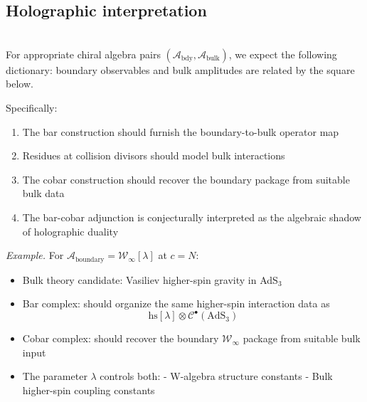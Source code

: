 \subsection{Holographic interpretation}

\begin{conjecture}\label{conj:holographic-koszul}
\leavevmode\\
For appropriate chiral algebra pairs
$(\mathcal{A}_{\mathrm{bdy}}, \mathcal{A}_{\mathrm{bulk}})$,
we expect the following dictionary:
boundary observables and bulk amplitudes are related by the square below.

\begin{center}
\end{center}

Specifically:
\begin{enumerate}
\item The bar construction should furnish the boundary-to-bulk operator map
\item Residues at collision divisors should model bulk interactions
\item The cobar construction should recover the boundary package from suitable bulk data
\item The bar-cobar adjunction is conjecturally interpreted as the algebraic shadow of holographic duality
\end{enumerate}

\emph{Example.} For $\mathcal{A}_{\text{boundary}} = \mathcal{W}_{\infty}[\lambda]$ at $c = N$:
\begin{itemize}
\item Bulk theory candidate: Vasiliev higher-spin gravity in AdS$_3$
\item Bar complex: should organize the same higher-spin interaction data as
  \[\text{hs}[\lambda] \otimes \mathcal{C}^{\bullet}(\text{AdS}_3)\]
\item Cobar complex: should recover the boundary $\mathcal{W}_{\infty}$ package from suitable bulk input
\item The parameter $\lambda$ controls both:
  - W-algebra structure constants
  - Bulk higher-spin coupling constants
\end{itemize}
\end{conjecture}

